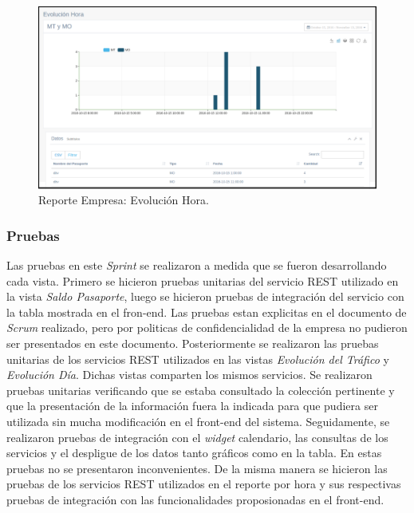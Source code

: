 \begin{figure}[ht]
  \centering
  \includegraphics[scale=0.30,type=png,ext=.png,read=.png]{imagenes/reeh}
  \caption{Reporte Empresa: Evolución Hora.}
  \label{fig:reeh}
\end{figure}

\subsubsection{Pruebas}
\indent Las pruebas en este \textit{Sprint} se realizaron a medida que se fueron desarrollando cada vista. Primero se hicieron pruebas unitarias del servicio REST utilizado en la vista \textit{Saldo Pasaporte}, luego se hicieron pruebas de integración del servicio con la tabla mostrada en el fron-end. Las pruebas estan explicitas en el documento de \textit{Scrum} realizado, pero por politicas de confidencialidad de la empresa no pudieron ser presentados en este documento.
\newline
\newline
\indent Posteriormente se realizaron las pruebas unitarias de los servicios REST utilizados en las vistas \textit{Evolución del Tráfico} y \textit{Evolución Día}. Dichas vistas comparten los mismos servicios. Se realizaron pruebas unitarias verificando que se estaba consultado la colección pertinente y que la presentación de la información fuera la indicada para que pudiera ser utilizada sin mucha modificación en el front-end del sistema. Seguidamente, se realizaron pruebas de integración con el \textit{widget} calendario, las consultas de los servicios y el despligue de los datos tanto gráficos como en la tabla. En estas pruebas no se presentaron inconvenientes. De la misma manera se hicieron las pruebas de los servicios REST utilizados en el reporte por hora y sus respectivas pruebas de integración con las funcionalidades proposionadas en el front-end.

